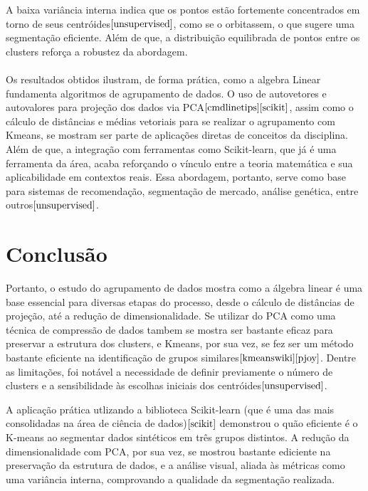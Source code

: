 \documentclass[a4paper,12pt]{article}
\begin{document}
A baixa variância interna indica que os pontos estão fortemente concentrados em torno de seus centróides$\cite{unsupervised}$, como se o orbitassem, o que sugere uma segmentação eficiente. Além de que, a distribuição equilibrada de pontos entre os clusters reforça a robustez da abordagem.
\\
\\
   Os resultados obtidos ilustram, de forma prática, como a algebra Linear fundamenta algoritmos de agrupamento de dados. O uso de autovetores e autovalores para projeção dos dados via PCA$\cite{cmdlinetips}\cite{scikit}$, assim como o cálculo de distâncias e médias vetoriais para se realizar o agrupamento com Kmeans, se mostram ser parte de aplicações diretas de conceitos da disciplina.
Além de que, a integração com ferramentas como Scikit-learn, que já é uma ferramenta da área, acaba reforçando o vínculo entre a teoria matemática e sua aplicabilidade em contextos reais. Essa abordagem, portanto, serve como base para sistemas de recomendação, segmentação de mercado, análise genética, entre outros$\cite{unsupervised}$.

\newpage
\section{Conclusão}

Portanto, o estudo do agrupamento de dados mostra como a álgebra linear é uma base essencial para diversas etapas do processo, desde o cálculo de distâncias de projeção, até a redução de dimensionalidade. Se utilizar do PCA como uma técnica de compressão de dados tambem se mostra ser bastante eficaz para preservar a estrutura dos clusters, e Kmeans, por sua vez, se fez ser um método bastante eficiente na identificação de grupos similares$\cite{kmeanswiki}\cite{pjoy}$. Dentre as limitações, foi notável a necessidade de definir previamente o número de clusters e a sensibilidade às escolhas iniciais dos centróides$\cite{unsupervised}$.


A aplicação prática utlizando a biblioteca Scikit-learn (que é uma das mais consolidadas na área de ciência de dados)$\cite{scikit}$ demonstrou o quão eficiente é o K-means ao segmentar dados sintéticos em três grupos distintos. A redução  da dimensionalidade com PCA, por sua vez, se mostrou bastante ediciente na preservação da estrutura de dados, e a análise visual, aliada às métricas como uma variância interna, comprovando a qualidade da segmentação realizada.
\end{document}
